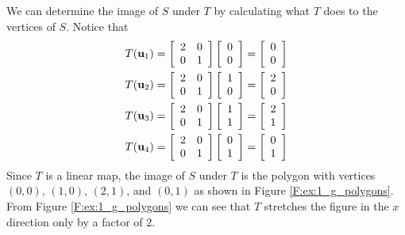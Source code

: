 \begin{example}
\item We can determine the image of $S$ under $T$ by calculating what $T$ does to the vertices of $S$. Notice that 
\begin{align*}
T(\mathbf{u}_1) &= \left[ \begin{array}{cc} 2&0\\0&1 \end{array}\right] \left[ \begin{array}{c} 0\\0 \end{array} \right] = \left[ \begin{array}{c} 0\\0 \end{array} \right] \\
T(\mathbf{u}_2) &= \left[ \begin{array}{cc} 2&0\\0&1 \end{array}\right] \left[ \begin{array}{c} 1\\0 \end{array} \right] = \left[ \begin{array}{c} 2\\0 \end{array} \right] \\
T(\mathbf{u}_3) &= \left[ \begin{array}{cc} 2&0\\0&1 \end{array}\right] \left[ \begin{array}{c} 1\\1 \end{array} \right] = \left[ \begin{array}{c} 2\\1 \end{array} \right] \\
T(\mathbf{u}_4) &= \left[ \begin{array}{cc} 2&0\\0&1 \end{array}\right] \left[ \begin{array}{c} 0\\1 \end{array} \right] = \left[ \begin{array}{c} 0\\1 \end{array} \right] 
\end{align*}
Since $T$ is a linear map, the image of $S$ under $T$ is the polygon with vertices $(0,0)$, $(1,0)$, $(2,1)$, and $(0,1)$ as shown in Figure \ref{F:ex:1_g_polygons}.
From Figure \ref{F:ex:1_g_polygons} we can see that $T$ stretches the figure in the $x$ direction only by a factor of 2. 


\end{example}
